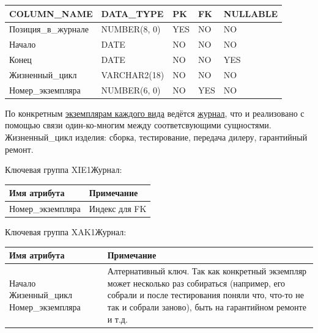 \begin{enumerate}
    \begin{tabular}{|p{7cm}|p{3cm}|p{1cm}|p{1cm}|p{3cm}|} \hline

        {\bf COLUMN\_NAME} & {\bf DATA\_TYPE} & {\bf PK} & {\bf FK} & {\bf NULLABLE} \\ \hline
        Позиция\_в\_журнале & NUMBER(8, 0) & YES & NO & NO \\ \hline
        Начало & DATE & NO & NO & NO \\ \hline
        Конец & DATE & NO & NO & YES \\ \hline
        Жизненный\_цикл & VARCHAR2(18) & NO & NO & NO \\ \hline
        Номер\_экземпляра & NUMBER(6, 0) & NO & YES & NO \\ \hline

    \end{tabular}

    По конкретным \underline{экземплярам каждого вида} ведётся \underline{журнал}, что и реализовано с помощью связи один-ко-многим между соответсвующими сущностями.
    Жизненный\_цикл изделия: сборка, тестирование, передача дилеру, гарантийный ремонт.

    Ключевая группа XIE1Журнал:

    \begin{tabular}{|p{7cm}|p{9.3cm}|} \hline

        {\bf Имя атрибута} & {\bf Примечание} \\ \hline
        Номер\_экземпляра & Индекс для FK \\ \hline

    \end{tabular}

    Ключевая группа XAK1Журнал:

    \begin{tabular}{|p{7cm}|p{9.3cm}|} \hline

        {\bf Имя атрибута} & {\bf Примечание} \\ \hline
        Начало \newline Жизенный\_цикл \newline Номер\_экземпляра & Алтернативный ключ.
        Так как конкретный экземпляр может несколько раз собираться (например, его собрали и после тестирования поняли что, что-то не так и собрали заново), быть на гарантийном ремонте и т.д. \\ \hline

    \end{tabular}

\end{enumerate}

